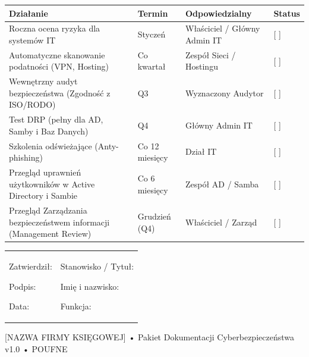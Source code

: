 \documentclass[12pt,a4paper]{article}
\begin{document}
\begin{longtable}[]{@{}>{\raggedright\arraybackslash}p{}>{\raggedright\arraybackslash}p{}>{\raggedright\arraybackslash}p{}>{\raggedright\arraybackslash}p{}@{}}
\toprule\noalign{}
Działanie & Termin & Odpowiedzialny & Status \\
\midrule\noalign{}
\endhead
\bottomrule\noalign{}
\endlastfoot
Roczna ocena ryzyka dla systemów IT & Styczeń & Właściciel / Główny Admin IT & {[} {]} \underline{\hspace{2cm}} \\
Automatyczne skanowanie podatności (VPN, Hosting) & Co kwartał & Zespół Sieci / Hostingu & {[} {]} \underline{\hspace{2cm}} \\
Wewnętrzny audyt bezpieczeństwa (Zgodność z ISO/RODO) & Q3 & Wyznaczony Audytor & {[} {]} \underline{\hspace{2cm}} \\
Test DRP (pełny dla AD, Samby i Baz Danych) & Q4 & Główny Admin IT & {[} {]} \underline{\hspace{2cm}} \\
Szkolenia odświeżające (Anty-phishing) & Co 12 miesięcy & Dział IT & {[} {]} \underline{\hspace{2cm}} \\
Przegląd uprawnień użytkowników w Active Directory i Sambie & Co 6 miesięcy & Zespół AD / Samba & {[} {]} \underline{\hspace{2cm}} \\
Przegląd Zarządzania bezpieczeństwem informacji (Management Review) & Grudzień (Q4) & Właściciel / Zarząd & {[} {]}\underline{\hspace{2cm}} \\
\end{longtable}

\begin{longtable}[]{@{}
  >{\raggedright\arraybackslash}p{}
  >{\raggedright\arraybackslash}p{}@{}}
\toprule\noalign{}
\endhead
\bottomrule\noalign{}
\endlastfoot
\begin{minipage}[t]{\linewidth}\raggedright
Zatwierdził:

Podpis: \underline{\hspace{3cm}}

Data: \underline{\hspace{4cm}}
\end{minipage} & \begin{minipage}[t]{\linewidth}\raggedright
Stanowisko / Tytuł:

Imię i nazwisko: \underline{\hspace{3cm}}

Funkcja: \underline{\hspace{3cm}}
\end{minipage} \\
\end{longtable}

{[}NAZWA FIRMY KSIĘGOWEJ{]} • Pakiet Dokumentacji Cyberbezpieczeństwa
v1.0 • POUFNE
\end{document}
